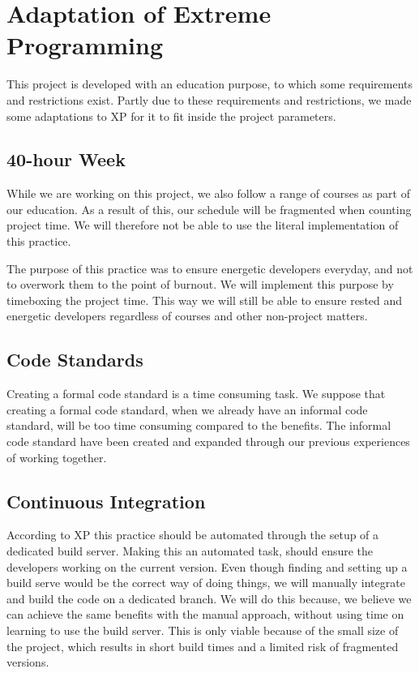 \section{Adaptation of Extreme Programming}
This project is developed with an education purpose, to which some requirements and restrictions exist.
Partly due to these requirements and restrictions, we made some adaptations to XP for it to fit inside the project parameters.

\subsection{40-hour Week}
While we are working on this project, we also follow a range of courses as part of our education.
As a result of this, our schedule will be fragmented when counting project time.
We will therefore not be able to use the literal implementation of this practice.

The purpose of this practice was to ensure energetic developers everyday, and not to overwork them to the point of burnout.
We will implement this purpose by timeboxing the project time.
This way we will still be able to ensure rested and energetic developers regardless of courses and other non-project matters.

\subsection{Code Standards}
Creating a formal code standard is a time consuming task.
We suppose that creating a formal code standard, when we already have an informal code standard, will be too time consuming compared to the benefits.
The informal code standard have been created and expanded through our previous experiences of working together.

\subsection{Continuous Integration}
According to XP this practice should be automated through the setup of a dedicated build server.
Making this an automated task, should ensure the developers working on the current version.
Even though finding and setting up a build serve would be the correct way of doing things, we will manually integrate and build the code on a dedicated branch.
We will do this because, we believe we can achieve the same benefits with the manual approach, without using time on learning to use the build server.
This is only viable because of the small size of the project, which results in short build times and a limited risk of fragmented versions.

